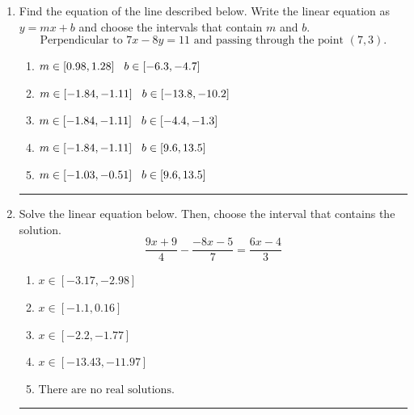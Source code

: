 \documentclass[14pt]{extbook}
\newcommand{\litem}[1]{\item#1\hspace*{-1cm}\rule{\textwidth}{0.4pt}}
\begin{document}
\begin{enumerate}
\litem{
Find the equation of the line described below. Write the linear equation as $ y=mx+b $ and choose the intervals that contain $m$ and $b$.\[ \text{Perpendicular to } 7 x - 8 y = 11 \text{ and passing through the point } (7, 3). \]\begin{enumerate}[label=\Alph*.]
\item \( m \in [0.98, 1.28] \hspace*{3mm} b \in [-6.3, -4.7] \)
\item \( m \in [-1.84, -1.11] \hspace*{3mm} b \in [-13.8, -10.2] \)
\item \( m \in [-1.84, -1.11] \hspace*{3mm} b \in [-4.4, -1.3] \)
\item \( m \in [-1.84, -1.11] \hspace*{3mm} b \in [9.6, 13.5] \)
\item \( m \in [-1.03, -0.51] \hspace*{3mm} b \in [9.6, 13.5] \)

\end{enumerate} }
\litem{
Solve the linear equation below. Then, choose the interval that contains the solution.\[ \frac{9x + 9}{4} - \frac{-8x -5}{7} = \frac{6x -4}{3} \]\begin{enumerate}[label=\Alph*.]
\item \( x \in [-3.17, -2.98] \)
\item \( x \in [-1.1, 0.16] \)
\item \( x \in [-2.2, -1.77] \)
\item \( x \in [-13.43, -11.97] \)
\item \( \text{There are no real solutions.} \)


\end{enumerate}}
\end{enumerate}
\end{document}
